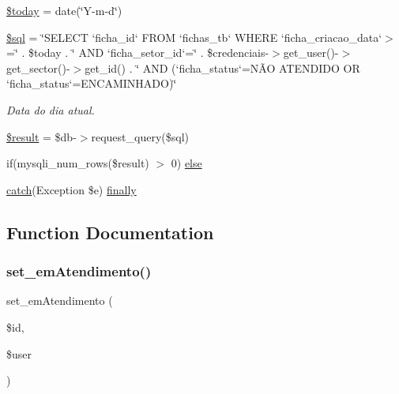\begin{DoxyCompactItemize}
\hyperlink{nao_atendidos_proximo_8php_af1b7fb9d06cdc6d22c14741fc3cc185a}{\$today} = date(\char`\"{}Y-\/m-\/d\char`\"{})
\item 
\hyperlink{nao_atendidos_proximo_8php_a047170d6020a882807665812a27e2525}{\$sql} = \char`\"{}S\+E\+L\+E\+CT `ficha\+\_\+id` F\+R\+OM `fichas\+\_\+tb` W\+H\+E\+RE `ficha\+\_\+criacao\+\_\+data`$>$=\textquotesingle{}\char`\"{} . \$today . \char`\"{}\textquotesingle{} A\+ND `ficha\+\_\+setor\+\_\+id`=\char`\"{} . \$credenciais-\/$>$get\+\_\+user()-\/$>$get\+\_\+sector()-\/$>$get\+\_\+id() . \char`\"{} A\+ND (`ficha\+\_\+status`=\textquotesingle{}NÃO A\+T\+E\+N\+D\+I\+DO\textquotesingle{} OR `ficha\+\_\+status`=\textquotesingle{}E\+N\+C\+A\+M\+I\+N\+H\+A\+DO\textquotesingle{})\char`\"{}
\begin{DoxyCompactList}\small\item\em Data do dia atual. \end{DoxyCompactList}\item 
\hyperlink{nao_atendidos_proximo_8php_a112ef069ddc0454086e3d1e6d8d55d07}{\$result} = \$db-\/$>$request\+\_\+query(\$sql)
\item 
if(mysqli\+\_\+num\+\_\+rows(\$result) $>$ 0) \hyperlink{nao_atendidos_proximo_8php_aabe0fce4e8f9f822b09141ab57d918d9}{else}
\item 
\hyperlink{imprimir_2ficha_2index_8php_a8104793004944f01dd070fc8b1ade3c4}{catch}(Exception \$e) \hyperlink{nao_atendidos_proximo_8php_a1eb47d68a4a4f73debf91b15e179d813}{finally}
\end{DoxyCompactItemize}


\subsection{Function Documentation}
\mbox{\label{nao_atendidos_proximo_8php_aa053116387f6a1dc0020775d61ef19e0}} 
\subsubsection{\texorpdfstring{set\+\_\+em\+Atendimento()}{set\_emAtendimento()}}
{\footnotesize\ttfamily set\+\_\+em\+Atendimento (\begin{DoxyParamCaption}\item[{}]{\$id,  }\item[{}]{\$user }\end{DoxyParamCaption})}



